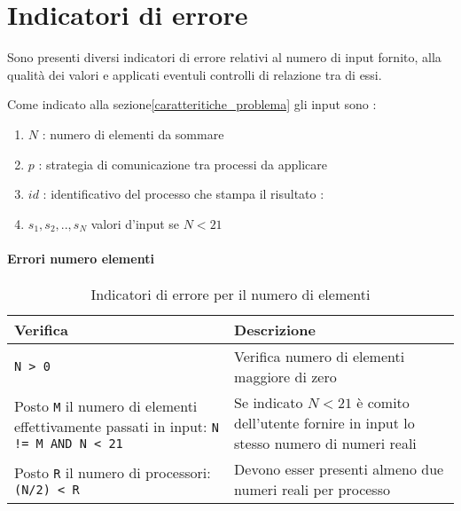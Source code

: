 \documentclass[a4paper,11pt]{book}
\begin{document}
\chapter{Indicatori di errore}
Sono presenti diversi indicatori di errore relativi al numero di input fornito, alla qualità dei valori e applicati eventuli controlli di relazione tra di essi. \par 
Come indicato alla sezione\ref{caratteritiche_problema} gli input sono :
\begin{enumerate}
    \item $N$ : numero di elementi da sommare
    \item $p$ : strategia di comunicazione tra processi da applicare
    \item $id$ : identificativo del processo che stampa il risultato :
    \item $s_1,s_2,..,s_N$ valori d'input se $N < 21$ 
\end{enumerate}

\subsubsection{Errori numero elementi}
\begin{table}[H]
    \begin{tabular}{| p{} | p{} |}
        \hline
        \rowcolor{header}
        \textbf{Verifica} & \textbf{Descrizione} \\
        \hline
        \verb|N > 0| & 
        Verifica numero di elementi maggiore di zero \\
        \hline
        Posto \verb|M| il numero di elementi effettivamente passati in input: \verb|N != M AND N < 21| & 
        Se indicato $N < 21$ è comito dell'utente fornire in input lo stesso numero di numeri reali \\
        \hline
        Posto \verb|R| il numero di processori: \verb|(N/2) < R| & 
        Devono esser presenti almeno due numeri reali per processo\\
        \hline
    \end{tabular}
    \caption{Indicatori di errore per il numero di elementi}
    \label{tab:Indicatori di errore per il numero di elementi}
\end{table}
\end{document}
